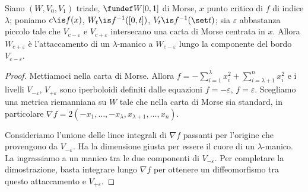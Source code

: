 \begin{teo}
	Siano $(W,V_0,V_1)$ triade, $\fundef W{[0,1]}$ di Morse, $x$ punto critico di $f$ di indice $\lambda$;
	poniamo $c\is f(x)$, $W_t\is f^{-1}([0,t])$, $V_t\is f^{-1}(\set t)$;
	sia $\varepsilon$ abbastanza piccolo tale che $V_{c-\varepsilon}$ e $V_{c+\varepsilon}$ intersecano una carta di Morse centrata in $x$.
	Allora $W_{c+\varepsilon}$ è l'attaccamento di un $\lambda$-manico a $W_{c-\varepsilon}$ lungo la componente del bordo $V_{c-\varepsilon}$.
\end{teo}

\begin{proof}
	Mettiamoci nella carta di Morse.
	Allora $f=-\sum_{i=1}^\lambda x_i^2+\sum_{i=\lambda+1}^n x_i^2$ e i livelli $V_{-\varepsilon}$, $V_{+\varepsilon}$ sono iperboloidi definiti dalle equazioni $f=-\varepsilon$, $f=\varepsilon$.
	Scegliamo una metrica riemanniana su $W$ tale che nella carta di Morse sia standard, in particolare $\nabla f=2(-x_1,\dots,-x_\lambda,x_{\lambda+1},\dots,x_n)$.
	
	Consideriamo l'unione delle linee integrali di $\nabla f$ passanti per l'origine che provengono da $V_{-\varepsilon}$.
	Ha la dimensione giusta per essere il cuore di un $\lambda$-manico.
	La ingrassiamo a un manico tra le due componenti di $V_{-\varepsilon}$.
	Per completare la dimostrazione, basta integrare lungo $\nabla f$ per ottenere un diffeomorfismo tra questo attaccamento e $V_{+\varepsilon}$. 
\end{proof}
